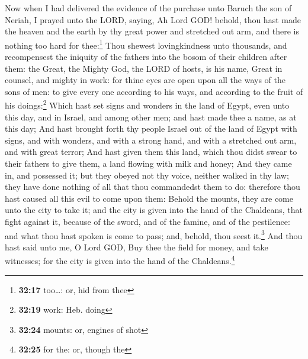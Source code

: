  Now when I had delivered the evidence of the purchase
unto Baruch the son of Neriah, I prayed unto the LORD, saying,
 Ah Lord GOD! behold, thou hast made the heaven and the
earth by thy great power and stretched out arm, and there is nothing too
hard for thee:\footnote{\textbf{32:17} too\ldots: or, hid from thee}
 Thou shewest lovingkindness unto thousands, and
recompensest the iniquity of the fathers into the bosom of their
children after them: the Great, the Mighty God, the LORD of hosts, is
his name,  Great in counsel, and mighty in work: for
thine eyes are open upon all the ways of the sons of men: to give every
one according to his ways, and according to the fruit of his
doings:\footnote{\textbf{32:19} work: Heb. doing}  Which
hast set signs and wonders in the land of Egypt, even unto this day, and
in Israel, and among other men; and hast made thee a name, as at this
day;  And hast brought forth thy people Israel out of the
land of Egypt with signs, and with wonders, and with a strong hand, and
with a stretched out arm, and with great terror;  And
hast given them this land, which thou didst swear to their fathers to
give them, a land flowing with milk and honey;  And they
came in, and possessed it; but they obeyed not thy voice, neither walked
in thy law; they have done nothing of all that thou commandedst them to
do: therefore thou hast caused all this evil to come upon them:
 Behold the mounts, they are come unto the city to take
it; and the city is given into the hand of the Chaldeans, that fight
against it, because of the sword, and of the famine, and of the
pestilence: and what thou hast spoken is come to pass; and, behold, thou
seest it.\footnote{\textbf{32:24} mounts: or, engines of shot}
 And thou hast said unto me, O Lord GOD, Buy thee the
field for money, and take witnesses; for the city is given into the hand
of the Chaldeans.\footnote{\textbf{32:25} for the: or, though the}

